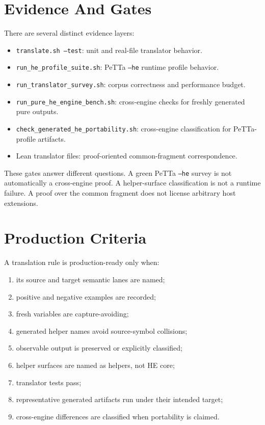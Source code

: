\documentclass[11pt]{article}
\newcommand{\code}[1]{\texttt{#1}}
\newcommand{\HE}{\textup{HE}}
\newcommand{\PeTTa}{\textup{PeTTa}}
\begin{document}
\section{Evidence And Gates}

There are several distinct evidence layers:

\begin{itemize}
\item \code{translate.sh --test}: unit and real-file translator behavior.
\item \code{run\_he\_profile\_suite.sh}: \PeTTa{} \code{--he} runtime profile behavior.
\item \code{run\_translator\_survey.sh}: corpus correctness and performance budget.
\item \code{run\_pure\_he\_engine\_bench.sh}: cross-engine checks for freshly generated pure outputs.
\item \code{check\_generated\_he\_portability.sh}: cross-engine classification for \PeTTa{}-profile artifacts.
\item Lean translator files: proof-oriented common-fragment correspondence.
\end{itemize}

These gates answer different questions.  A green \PeTTa{} \code{--he} survey is
not automatically a cross-engine proof.  A helper-surface classification is not
a runtime failure.  A proof over the common fragment does not license arbitrary
host extensions.

\section{Production Criteria}

A translation rule is production-ready only when:
\begin{enumerate}
\item its source and target semantic lanes are named;
\item positive and negative examples are recorded;
\item fresh variables are capture-avoiding;
\item generated helper names avoid source-symbol collisions;
\item observable output is preserved or explicitly classified;
\item helper surfaces are named as helpers, not \HE{} core;
\item translator tests pass;
\item representative generated artifacts run under their intended target;
\item cross-engine differences are classified when portability is claimed.
\end{enumerate}
\end{document}
